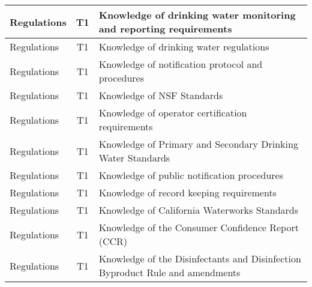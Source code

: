 \documentclass{article}
\begin{document}
\begin{table}[]
\begin{tabular}{|l|c|l|}
Regulations                            & T1             & Knowledge of drinking   water monitoring and reporting requirements                                                               \\ \hline
Regulations                            & T1             & Knowledge of drinking   water regulations                                                                                         \\ \hline
Regulations                            & T1             & Knowledge of   notification protocol and procedures                                                                               \\ \hline
Regulations                            & T1             & Knowledge of NSF   Standards                                                                                                      \\ \hline
Regulations                            & T1             & Knowledge of operator   certification requirements                                                                                \\ \hline
Regulations                            & T1             & Knowledge of Primary   and Secondary Drinking Water Standards                                                                     \\ \hline
Regulations                            & T1             & Knowledge of public   notification procedures                                                                                     \\ \hline
Regulations                            & T1             & Knowledge of record   keeping requirements                                                                                        \\ \hline
Regulations                            & T1             & Knowledge of   California Waterworks Standards                                                                                    \\ \hline
Regulations                            & T1             & Knowledge of the   Consumer Confidence Report (CCR)                                                                               \\ \hline
Regulations                            & T1             & Knowledge of the   Disinfectants and Disinfection Byproduct Rule and amendments                                                   \\ \hline

\end{tabular}
\end{table}
\end{document}

